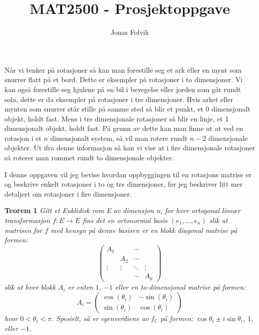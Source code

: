 \documentclass[a4paper,10pt,english]{article}
\title{MAT2500 - Prosjektoppgave}
\author{Jonas Folvik}
\begin{document}
    
    \maketitle

    Når vi tenker på rotasjoner så kan man forestille seg et ark eller en mynt som snurrer flatt på et bord. Dette er eksempler på rotasjoner i to dimensjoner.
    Vi kan også forestille seg hjulene på en bil i bevegelse eller jorden som går rundt sola, dette er da eksempler på rotasjoner i tre dimensjoner.
    Hvis arket eller mynten som snurrer står stille på samme sted så blir et punkt, et 0 dimensjonalt objekt, holdt fast. Mens i tre dimensjonale rotasjoner så blir en linje, et 1 dimensjonalt objekt, holdt fast.
    På grunn av dette kan man finne ut at ved en rotasjon i et $n$ dimensjonalt system, så vil man rotere rundt $n-2$ dimensjonale objekter.
    Ut ifra denne informasjon så kan vi vise at i fire dimensjonale rotasjoner så roterer man rommet rundt to dimensjonale objekter.

    I denne oppgaven vil jeg bevise hvordan oppbyggingen til en rotasjons matrise er og beskrive enkelt rotasjoner i to og tre dimensjoner, før jeg beskriver litt mer detaljert om rotasjoner i fire dimensjoner.

    \textbf{Teorem 1} \textit{Gitt et Euklidisk rom E av dimensjon n, for hver ortogonal lineær transformasjon $f \colon E \rightarrow E$ fins det en ortonormal basis $\left( e_{1}, \dots, e_{n} \right)$
                              slik at matrisen for $f$ med hensyn på denne basisen er en blokk diagonal matrise på formen: 
                              $$
                              \begin{pmatrix}
                                A_{1}  &        & \cdots &        \\
                                       & A_{2}  & \cdots &        \\
                                \vdots & \vdots & \ddots & \vdots \\
                                       &        & \cdots & A_{p}
                              \end{pmatrix}
                              $$
                              slik at hver blokk $A_{i}$ er enten $1$, $-1$ eller en to-dimensjonal matrise på formen:
                              $$ A_{i} = 
                              \begin{pmatrix}
                                \cos(\theta_{i}) & -\sin(\theta_{i}) \\
                                \sin(\theta_{i}) &  \cos(\theta_{i})
                              \end{pmatrix}
                              $$
                              hvor $0 < \theta_{i} < \pi$. Spesielt, så er egenverdiene av $f_{\mathbb{C}}$ på formen: $\cos\theta_{i} \pm i\sin\theta_{i}$, $1$, eller $-1$.} \cite{GMA}
\end{document}
